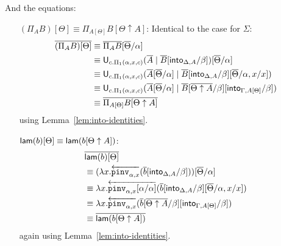 \documentclass[10pt]{article}
\theoremstyle{definition}
\newcommand{\rewrite}[2]{\overleftarrow{#1}(#2)}
\newcommand\U[3]{\ensuremath{\mathsf{U}_{#1}(#2 \mid #3)}}
\newcommand\UI[2]{\ensuremath{\lambda #1.#2}}
\begin{document}
And the equations:
\begin{enumerate}[style = multiline, labelwidth = 80pt]
\item[{$(\Pi_A B)[\Theta] \equiv \Pi_{A[\Theta]} B[\Theta \uparrow A]$}:] Identical to the case for $\Sigma$:
\begin{align*}
\upstairs{(\Pi_A B)[\Theta]}
&\equiv \upstairs{\Pi_A B}[\upstairs{\Theta}/\alpha] \\
&\equiv \U{c.\Pi_1(\alpha,x,c)}{\upstairs{A}}{\upstairs{B}[\into{\Delta, A}/\beta]}[\upstairs{\Theta}/\alpha] \\
&\equiv \U{c.\Pi_1(\alpha,x,c)}{\upstairs{A}[\upstairs{\Theta}/\alpha]}{\upstairs{B}[\into{\Delta, A}/\beta][\upstairs{\Theta}/\alpha,x/x]} \\
&\equiv \U{c.\Pi_1(\alpha,x,c)}{\upstairs{A}[\upstairs{\Theta}/\alpha]}{\upstairs{B}[\upstairs{\Theta \uparrow A}/\beta][\into{\Gamma, A[\Theta]}/\beta]} \\
&\equiv \upstairs{\Pi_{A[\Theta]} B[\Theta \uparrow A]}
\end{align*}
using Lemma~\ref{lem:into-identities}.

\item[{$\mathsf{lam}(b)[\Theta] \equiv \mathsf{lam}(b[\Theta \uparrow A])$}:]
\begin{align*}
&\upstairs{\qlam(b)[\Theta]} \\
&\equiv (\UI{x}{\rewrite{\pinv{\alpha,x}}{\upstairs{b}[\into{\Delta, A}/\beta]}})[\upstairs{\Theta}/\alpha] \\
&\equiv \UI{x}{\rewrite{\pinv{\alpha,x}[\alpha/\alpha]}{\upstairs{b}[\into{\Delta, A}/\beta][\upstairs{\Theta}/\alpha, x / x]}} \\
&\equiv \UI{x}{\rewrite{\pinv{\alpha,x}}{\upstairs{b}[\upstairs{\Theta \uparrow A}/\beta][\into{\Gamma, A[\Theta]}/\beta]}} \\
&\equiv \upstairs{\qlam(b[\Theta \uparrow A])}
\end{align*}
again using Lemma~\ref{lem:into-identities}.


\end{enumerate}
\end{document}
